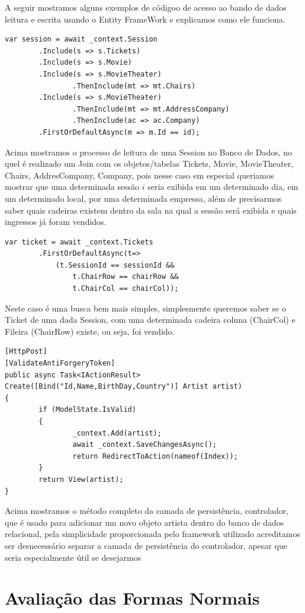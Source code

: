 \documentclass[a4paper,10pt]{article}
\begin{document}
A seguir mostramos alguns exemplos de códigoo de acesso ao bando de dados leitura e escrita usando o Entity FrameWork e explicamos como ele funciona.

\begin{lstlisting}
var session = await _context.Session
		.Include(s => s.Tickets)
		.Include(s => s.Movie)
		.Include(s => s.MovieTheater)
				.ThenInclude(mt => mt.Chairs)
		.Include(s => s.MovieTheater)
				.ThenInclude(mt => mt.AddressCompany)
				.ThenInclude(ac => ac.Company)
		.FirstOrDefaultAsync(m => m.Id == id);
\end{lstlisting}

Acima mostramos o processo de leitura de uma Session no Banco de Dados, no quel é realizado um Join com os objetos/tabelas Tickets, Movie, MovieTheater, Chairs, AddresCompany, Company, pois nesse caso em especial queriamos mostrar que uma determinada sessão $i$ seria exibida em um determinado dia, em um determinado local, por uma determinada empressa, além de precisarmos saber quais cadeiras existem dentro da sala na qual a sessão será exibida e quais ingressos já foram vendidos.

\begin{lstlisting}
var ticket = await _context.Tickets
		.FirstOrDefaultAsync(t=> 
			(t.SessionId == sessionId && 
				t.ChairRow == chairRow && 
				t.ChairCol == chairCol));
\end{lstlisting}

Neste caso é uma busca bem mais simples, simplesmente queremos saber se o Ticket de uma dada Session, com uma determinada cadeira coluna (ChairCol) e Fileira (ChairRow) existe, ou seja, foi vendido.

\begin{lstlisting}
[HttpPost]
[ValidateAntiForgeryToken]
public async Task<IActionResult> Create([Bind("Id,Name,BirthDay,Country")] Artist artist)
{
		if (ModelState.IsValid)
		{
				_context.Add(artist);
				await _context.SaveChangesAsync();
				return RedirectToAction(nameof(Index));
		}
		return View(artist);
}
\end{lstlisting}
Acima mostramos o método completo da camada de persistência, controlador, que é usado para adicionar um novo objeto artista dentro do banco de dados relacional, pela simplicidade proporcionada pelo framework utilizado acreditamos ser desnecessário separar a camada de persistência do controlador, apesar que seria especialmente útil se desejarmos 

\section{Avaliação das Formas Normais}

%
% 
\end{document}
